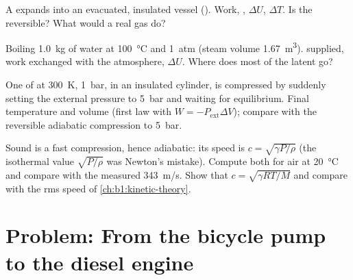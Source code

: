 \begin{exercise}[$\star\star$]\label{exo:b1:first-law:9}
A  expands into an evacuated, insulated vessel (). Work, , $\Delta U$, $\Delta T$. Is the 
reversible? What would a real gas do?
\end{exercise}

\begin{exercise}[$\star\star\star$]\label{exo:b1:first-law:10}
Boiling \qty{1.0}{kg} of water at \qty{100}{\degreeCelsius} and \qty{1}{atm}
(steam volume \qty{1.67}{m^3}).  supplied, work exchanged with the
atmosphere, $\Delta U$. Where does most of the latent  go?
\end{exercise}

\begin{exercise}[$\star\star\star$]\label{exo:b1:first-law:11}
One  of  at \qty{300}{K}, \qty{1}{bar}, in an insulated
cylinder, is compressed by suddenly setting the external pressure to
\qty{5}{bar} and waiting for equilibrium. Final temperature and volume
(first law with $W = -P_{\mathrm{ext}}\Delta V$); compare with the reversible
adiabatic compression to \qty{5}{bar}.
\end{exercise}

\begin{exercise}[$\star\star\star$]\label{exo:b1:first-law:12}
Sound is a fast compression, hence adiabatic: its speed is $c = \sqrt{\gamma P/\rho}$
(the isothermal value $\sqrt{P/\rho}$ was Newton's mistake). Compute both
for air at \qty{20}{\degreeCelsius} and compare with the measured
\qty{343}{m/s}. Show that $c = \sqrt{\gamma RT/M}$ and compare with the rms
speed of \cref{ch:b1:kinetic-theory}.
\end{exercise}

\section{Problem: From the bicycle pump to the diesel engine}


